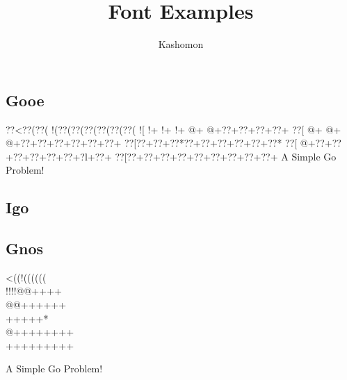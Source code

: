\documentclass{article}
\begin{document}
\title{Font Examples}
\author{Kashomon}
\maketitle

\begin{center}
\section*{Gooe}
{\goo
\0??<\0??(\0??(\- !(\0??(\0??(\0??(\0??(\0??(\0??(
\- ![\- !+\- !+\- !+\- @+\- @+\0??+\0??+\0??+\0??+
\0??[\- @+\- @+\- @+\0??+\0??+\0??+\0??+\0??+\0??+
\0??[\0??+\0??+\0??*\0??+\0??+\0??+\0??+\0??+\0??*
\0??[\- @+\0??+\0??+\0??+\0??+\0??+\0??+\0?l+\0??+
\0??[\0??+\0??+\0??+\0??+\0??+\0??+\0??+\0??+\0??+
}
A Simple Go Problem!
\end{center}

\begin{center}
\section*{Igo}
\end{center}

\begin{center}
\section*{Gnos}
{\gnos%
<((!((((((\\
!!!!@@++++\\
@@++++++\\
+++++*\\
@++++++++\\
+++++++++\\
}

A Simple Go Problem!
\end{center}
\end{document}
